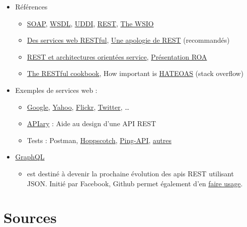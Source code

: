 \begin{itemize}
\tightlist
\item
  Références

  \begin{itemize}
  \tightlist
  \item
    \href{https://www.w3.org/TR/soap/}{SOAP},
    \href{https://www.w3.org/2002/ws/desc/}{WSDL},
    \href{http://uddi.xml.org/}{UDDI},
    \href{http://www.ics.uci.edu/~fielding/pubs/dissertation/top.htm}{REST},
    \href{http://www.oasis-ws-i.org/}{The WSIO}
  \item
    \href{https://larlet.fr/david/biologeek/archives/20070629-architecture-orientee-ressource-pour-faire-des-services-web-restful/}{Des
    services web RESTful},
    \href{https://web.archive.org/web/20160310205502/http://home.ccil.org/~cowan/restws.pdf}{Une
    apologie de REST} (recommandés)
  \item
    \href{http://www.figer.com/Publications/SOA.htm}{REST et
    architectures orientées service},
    \href{http://fr.slideshare.net/samijaber/symposium-dng-2008-roa}{Présentation
    ROA}
  \item
    \href{http://restcookbook.com/}{The RESTful cookbook}, How important
    is
    \href{http://stackoverflow.com/questions/20335967/how-useful-important-is-rest-hateoas-maturity-level-3}{HATEOAS}
    (stack overflow)
  \end{itemize}
\item
  Exemples de services web :

  \begin{itemize}
  \tightlist
  \item
    \href{https://developers.google.com/products/}{Google},
    \href{https://developer.yahoo.com/everything.html}{Yahoo},
    \href{https://www.flickr.com/services/api/}{Flickr},
    \href{https://dev.twitter.com/overview/api}{Twitter}, \ldots{}
  \item
    \href{https://apiary.io/}{APIary} : Aide au design d'une API REST
  \item
    Tests : Postman, \href{https://hoppscotch.io/}{Hoppscotch},
    \href{https://ping-api.com/}{Ping-API},
    \href{https://testsigma.com/blog/postman-alternatives/}{autres}
  \end{itemize}
\item
  \href{http://graphql.org/}{GraphQL}

  \begin{itemize}
  \tightlist
  \item
    est destiné à devenir la prochaine évolution des apis REST utilisant
    JSON. Initié par Facebook, Github permet également d'en
    \href{https://developer.github.com/v4/}{faire usage}.
  \end{itemize}
\end{itemize}

\hypertarget{sources}{%
\section{Sources}\label{sources}}
